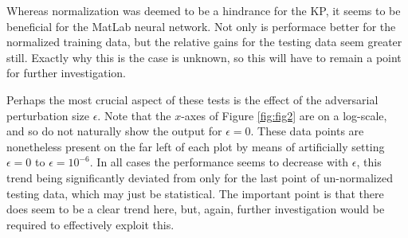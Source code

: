\documentclass          {article} %
\begin{document}
Whereas normalization was deemed to be a hindrance for the KP, it seems to be beneficial for the MatLab neural network. Not only is performace better for the normalized training data, but the relative gains for the testing data seem greater still. Exactly why this is the case is unknown, so this will have to remain a point for further investigation.

Perhaps the most crucial aspect of these tests is the effect of the adversarial perturbation size $\epsilon$. Note that the $x$-axes of Figure \ref{fig:fig2} are on a log-scale, and so do not naturally show the output for $\epsilon=0$. These data points are nonetheless present on the far left of each plot by means of artificially setting $\epsilon=0$ to $\epsilon=10^{-6}$. In all cases the performance seems to decrease with $\epsilon$, this trend being significantly deviated from only for the last point of un-normalized testing data, which may just be statistical. The important point is that there does seem to be a clear trend here, but, again, further investigation would be required to effectively exploit this.
\end{document}
